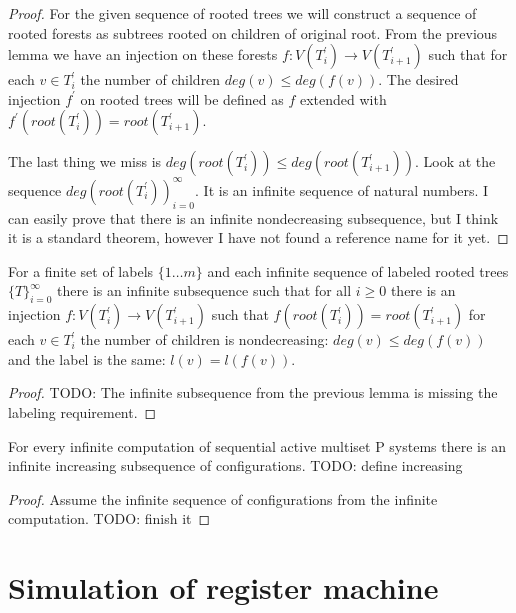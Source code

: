\documentclass[llncs,submission,copyright,creativecommons]{../lib/lncs/llncs}
\def\red{\color{red}}
\begin{document}
\begin{proof}
  For the given sequence of rooted trees we will construct a sequence of rooted forests as subtrees rooted on children of original root. From the previous lemma we have an injection on these forests $f: V(T_i^\prime) \rightarrow V(T_{i+1}^\prime)$ such that for each $v\in T_i^\prime$ the number of children $deg(v)\leq deg(f(v))$. The desired injection $f^\prime$ on rooted trees will be defined as $f$ extended with $f^\prime(root(T_i^\prime)) = root(T_{i+1}^\prime)$.

  The last thing we miss is $deg(root(T_i^\prime)) \leq deg(root(T_{i+1}^\prime))$. Look at the sequence $deg(root(T_i^\prime))_{i=0}^\infty$. It is an infinite sequence of natural numbers. I can easily prove that there is an infinite nondecreasing subsequence, but I think it is a standard theorem, however I have not found a reference name for it yet.
\end{proof}


\begin{lemma}
  For a finite set of labels $\{1\ldots m\}$ and each infinite sequence of labeled rooted trees $\{T\}_{i=0}^\infty$ there is an infinite subsequence such that for all $i\geq 0$ there is an injection $f: V(T_i^\prime) \rightarrow V(T_{i+1}^\prime)$ such that $f(root(T_i^\prime)) = root(T_{i+1}^\prime)$ for each $v\in T_i^\prime$ the number of children is nondecreasing: $deg(v)\leq deg(f(v))$ and the label is the same: $l(v)=l(f(v))$.
\end{lemma}

\begin{proof}
  TODO: The infinite subsequence from the previous lemma is missing the labeling requirement.
\end{proof}

\begin{lemma}
  For every infinite computation of sequential active multiset P systems there is an infinite increasing subsequence of configurations. TODO: define increasing 
\end{lemma}

\begin{proof}
  Assume the infinite sequence of configurations from the infinite computation. TODO: finish it
\end{proof}


\section{\red Simulation of register machine} %
\label{sec:simulation_of_register_machine}
\end{document}
